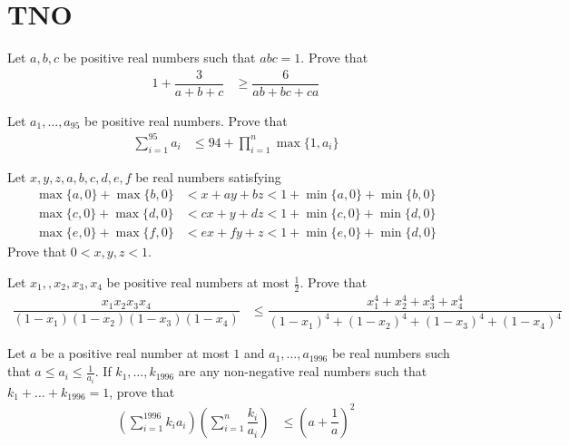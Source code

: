 \documentclass{subfile}
\begin{document}
	\section{TNO}\label{sec:tno}
	
		\begin{problem}
			Let $a,b,c$ be positive real numbers such that $abc=1$. Prove that
				\begin{align*}
					1+\dfrac{3}{a+b+c}
						& \geq \dfrac{6}{ab+bc+ca}
				\end{align*}
		\end{problem}
	
		\begin{problem}
			Let $a_{1},\ldots,a_{95}$ be positive real numbers. Prove that
				\begin{align*}
					\sum_{i=1}^{95}a_{i}
						& \leq 94+\prod_{i=1}^{n}\max\{1,a_{i}\}
				\end{align*}
		\end{problem}
	
		\begin{problem}
			Let $x,y,z,a,b,c,d,e,f$ be real numbers satisfying
				\begin{align*}
					\max\{a,0\}+\max\{b,0\}
						& < x+ay+bz<1+\min\{a,0\}+\min\{b,0\}\\
					\max\{c,0\}+\max\{d,0\}
						& < cx+y+dz<1+\min\{c,0\}+\min\{d,0\}\\
					\max\{e,0\}+\max\{f,0\}
						& < ex+fy+z<1+\min\{e,0\}+\min\{d,0\}
				\end{align*}
			Prove that $0<x,y,z<1$.
		\end{problem}
	
		\begin{problem}
			Let $x_{1},,x_{2},x_{3},x_{4}$ be positive real numbers at most $\frac{1}{2}$. Prove that
				\begin{align*}
					\dfrac{x_{1}x_{2}x_{3}x_{4}}{(1-x_{1})(1-x_{2})(1-x_{3})(1-x_{4})}
						& \leq \dfrac{x_{1}^{4}+x_{2}^{4}+x_{3}^{4}+x_{4}^{4}}{(1-x_{1})^{4}+(1-x_{2})^{4}+(1-x_{3})^{4}+(1-x_{4})^{4}}
				\end{align*}
		\end{problem}
	
		\begin{problem}
			Let $a$ be a positive real number at most $1$ and $a_{1},\ldots,a_{1996}$ be real numbers such that $a\leq a_{i}\leq\frac{1}{a_{i}}$. If $k_{1},\ldots,k_{1996}$ are any non-negative real numbers such that $k_{1}+\ldots+k_{1996}=1$, prove that
				\begin{align*}
					\left(\sum_{i=1}^{1996}k_{i}a_{i}\right)\left(\sum_{i=1}^{n}\dfrac{k_{i}}{a_{i}}\right)
						& \leq \left(a+\dfrac{1}{a}\right)^{2}
				\end{align*}
		\end{problem}
	
\end{document}
